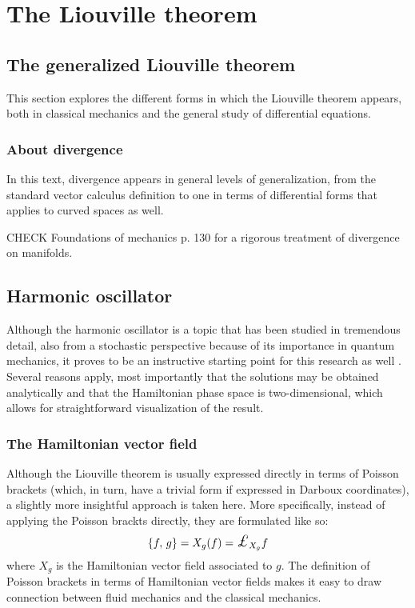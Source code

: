 \chapter{The Liouville theorem}

\section{The generalized Liouville theorem}
This section explores the different forms in which the Liouville theorem appears, both in classical mechanics and the general study of differential equations.

\subsection{About divergence}
In this text, divergence appears in general levels of generalization, from the standard vector calculus definition to one in terms of differential forms that applies to curved spaces as well.

CHECK Foundations of mechanics p. 130 for a rigorous treatment of divergence on manifolds.

\section{Harmonic oscillator}
Although the harmonic oscillator is a topic that has been studied in tremendous detail, also from a stochastic perspective because of its importance in quantum mechanics, it proves to be an instructive starting point for this research as well \cite{Dekker1975}. Several reasons apply, most importantly that the solutions may be obtained analytically and that the Hamiltonian phase space is two-dimensional, which allows for straightforward visualization of the result.

\subsection{The Hamiltonian vector field}
Although the Liouville theorem is usually expressed directly in terms of Poisson brackets (which, in turn, have a trivial form if expressed in Darboux coordinates), a slightly more insightful approach is taken here. More specifically, instead of applying the Poisson brackts directly, they are formulated like so:
$$ \poisson{f}{g} = X_g(f) = \lied{X_g}{f} $$
where $X_g$ is the Hamiltonian vector field associated to $g$. The definition of Poisson brackets in terms of Hamiltonian vector fields makes it easy to draw connection between fluid mechanics and the classical mechanics.

